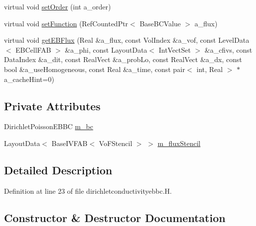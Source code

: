 \begin{DoxyCompactItemize}
\item 
virtual void \hyperlink{classdirichletconductivityebbc_ad6e533cc01399c8a45d4b2cb5e890c45}{set\+Order} (int a\+\_\+order)
\item 
virtual void \hyperlink{classdirichletconductivityebbc_aa3f4488e4445261bd7f8d527016dbb4e}{set\+Function} (Ref\+Counted\+Ptr$<$ Base\+B\+C\+Value $>$ a\+\_\+flux)
\item 
virtual void \hyperlink{classdirichletconductivityebbc_a3b26dd8b2345dd8c0da073f41e5bb255}{get\+E\+B\+Flux} (Real \&a\+\_\+flux, const Vol\+Index \&a\+\_\+vof, const Level\+Data$<$ E\+B\+Cell\+F\+AB $>$ \&a\+\_\+phi, const Layout\+Data$<$ Int\+Vect\+Set $>$ \&a\+\_\+cfivs, const Data\+Index \&a\+\_\+dit, const Real\+Vect \&a\+\_\+prob\+Lo, const Real\+Vect \&a\+\_\+dx, const bool \&a\+\_\+use\+Homogeneous, const Real \&a\+\_\+time, const pair$<$ int, Real $>$ $\ast$a\+\_\+cache\+Hint=0)
\end{DoxyCompactItemize}
\subsection*{Private Attributes}
\begin{DoxyCompactItemize}
\item 
Dirichlet\+Poisson\+E\+B\+BC \hyperlink{classdirichletconductivityebbc_a0b4c9e35b130645159874735dbd666e0}{m\+\_\+bc}
\item 
Layout\+Data$<$ Base\+I\+V\+F\+AB$<$ Vo\+F\+Stencil $>$ $>$ \hyperlink{classdirichletconductivityebbc_a60e6577ba1d68692174d0ae5f6224db3}{m\+\_\+flux\+Stencil}
\end{DoxyCompactItemize}


\subsection{Detailed Description}


Definition at line 23 of file dirichletconductivityebbc.\+H.



\subsection{Constructor \& Destructor Documentation}
